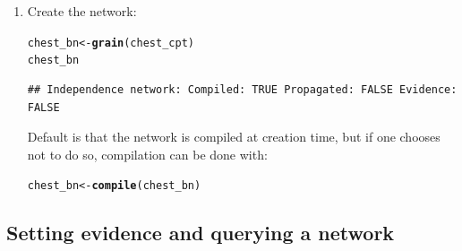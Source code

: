 \documentclass[10pt]{article}\usepackage[]{graphicx}\usepackage[]{xcolor}
\makeatletter
\newcommand{\hlstd}[1]{\textcolor[rgb]{0.345,0.345,0.345}{#1}}%
\newcommand{\hlkwb}[1]{\textcolor[rgb]{0.69,0.353,0.396}{#1}}%
\newcommand{\hlkwd}[1]{\textcolor[rgb]{0.737,0.353,0.396}{\textbf{#1}}}%
\newenvironment{kframe}{%
 \def\at@end@of@kframe{}%
 \ifinner\ifhmode%
  \def\at@end@of@kframe{\end{minipage}}%
  \begin{minipage}{\columnwidth}%
 \fi\fi%
 \def\FrameCommand##1{\hskip\@totalleftmargin \hskip-\fboxsep
 \colorbox{shadecolor}{##1}\hskip-\fboxsep
     \hskip-\linewidth \hskip-\@totalleftmargin \hskip\columnwidth}%
 \MakeFramed {\advance\hsize-\width
   \@totalleftmargin\z@ \linewidth\hsize
   \@setminipage}}%
 {\par\unskip\endMakeFramed%
 \at@end@of@kframe}
\newenvironment{knitrout}{}{} %
\makeatother
\begin{document}
\begin{enumerate}
\item Create the network:
\begin{knitrout}
\color{fgcolor}\begin{kframe}
\begin{alltt}
\hlstd{chest_bn} \hlkwb{<-} \hlkwd{grain}\hlstd{(chest_cpt)}
\hlstd{chest_bn}
\end{alltt}
\begin{verbatim}
## Independence network: Compiled: TRUE Propagated: FALSE Evidence: FALSE
\end{verbatim}
\end{kframe}
\end{knitrout}

Default is that the network is compiled at creation time, but if one
chooses not to do so, compilation can be done with:

\begin{knitrout}
\color{fgcolor}\begin{kframe}
\begin{alltt}
\hlstd{chest_bn} \hlkwb{<-} \hlkwd{compile}\hlstd{(chest_bn)}
\end{alltt}
\end{kframe}
\end{knitrout}

\end{enumerate}

\subsection{Setting evidence and querying a network}
\label{sec:querying-network}
\end{document}
